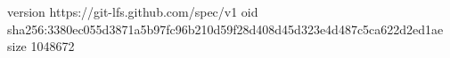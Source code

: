 version https://git-lfs.github.com/spec/v1
oid sha256:3380ec055d3871a5b97fc96b210d59f28d408d45d323e4d487c5ca622d2ed1ae
size 1048672
